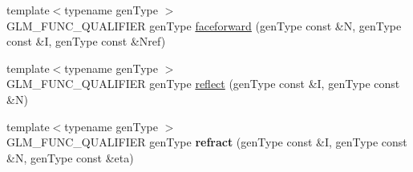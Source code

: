 \begin{DoxyCompactItemize}
\item 
{\footnotesize template$<$typename gen\+Type $>$ }\\G\+L\+M\+\_\+\+F\+U\+N\+C\+\_\+\+Q\+U\+A\+L\+I\+F\+I\+ER gen\+Type \hyperlink{group__core__func__geometric_ga4bbb036ef9527ee9f67384233029ed9b}{faceforward} (gen\+Type const \&N, gen\+Type const \&I, gen\+Type const \&Nref)
\item 
{\footnotesize template$<$typename gen\+Type $>$ }\\G\+L\+M\+\_\+\+F\+U\+N\+C\+\_\+\+Q\+U\+A\+L\+I\+F\+I\+ER gen\+Type \hyperlink{group__core__func__geometric_gab63646fc36b81cf69d3ce123a72f76f2}{reflect} (gen\+Type const \&I, gen\+Type const \&N)
\item 
{\footnotesize template$<$typename gen\+Type $>$ }\\G\+L\+M\+\_\+\+F\+U\+N\+C\+\_\+\+Q\+U\+A\+L\+I\+F\+I\+ER gen\+Type {\bfseries refract} (gen\+Type const \&I, gen\+Type const \&N, gen\+Type const \&eta)\hypertarget{namespaceglm_a9aa448ae8257316d0bd2a7ba6e9f201d}{}\label{namespaceglm_a9aa448ae8257316d0bd2a7ba6e9f201d}


\end{DoxyCompactItemize}
